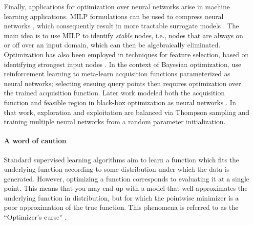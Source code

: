 Finally, applications for optimization over neural networks arise in machine learning applications. 
MILP formulations can be used to compress neural networks \citep{serra2020lossless,serra2021compression,elaraby2020importance}, which consequently result in more tractable surrogate models \citep{kody2022modeling}. The main idea is to use MILP to identify \textit{stable} nodes, i.e., nodes that are always on or off over an input domain, which can then be algebraically eliminated. 
Optimization has also been employed in techniques for feature selection, based on identifying strongest input nodes \citep{sildir2022mixed,zhao2023model}. 
In the context of Bayesian optimization, \cite{volpp2020meta} use reinforcement learning to meta-learn acquisition functions parameterized as neural networks; selecting ensuing query points then requires optimization over the trained acquisition function. 
Later work modeled both the acquisition function and feasible region in black-box optimization as neural networks \citep{papalexopoulos22constrained}. 
In that work, exploration and exploitation are balanced via Thompson sampling and training multiple neural networks from a random parameter initialization.



\paragraph{A word of caution}
Standard supervised learning algorithms aim to learn a function which fits the underlying function according to some distribution under which the data is generated. However, optimizing a function corresponds to evaluating it at a single point. This means that you may end up with a model that well-approximates the underlying function in distribution, but for which the pointwise minimizer is a poor approximation of the true function. This phenomena is referred to as the ``Optimizer's curse'' \citep{smith2006}.



